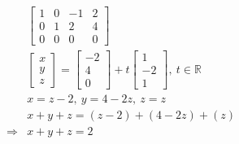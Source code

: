 \begin{solution}
\begin{align*}
    & \begin{bmatrix}
            1 & 0 & -1 & 2 \\
            0 & 1 & 2 & 4 \\
            0 & 0 & 0 & 0
    \end{bmatrix} \\
    & \begin{bmatrix}
            x \\
            y \\
            z 
    \end{bmatrix}
    =
    \begin{bmatrix}
            -2 \\
            4 \\
            0 
    \end{bmatrix} 
    +
    t
    \begin{bmatrix}
            1 \\
            -2 \\
            1 
    \end{bmatrix}, \ t \in \mathbb{R} \\
    & x = z - 2, \ y = 4 - 2z, \ z=z \\
    & x + y + z = \left(z-2\right) + \left(4 - 2z\right) + \left(z\right) \\
    \Longrightarrow & \boxed{x + y + z = 2}
\end{align*}


\end{solution}
